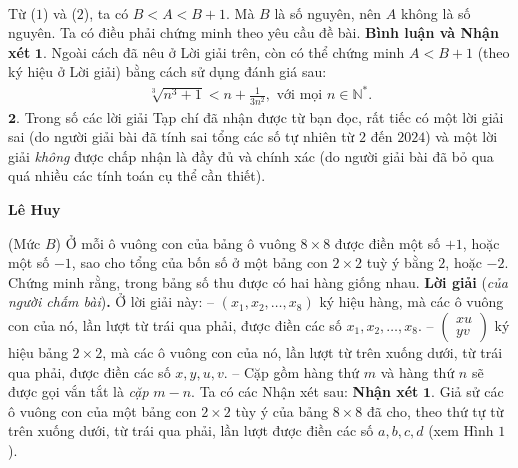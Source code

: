 \begin{multicols}{2}
\begin{align*}
	\end{align*}
	Từ ($1$) và ($2$), ta có $B < A < B + 1$. Mà $B$ là số nguyên, nên $A$ không là số nguyên.
	\vskip 0.05cm
	Ta có điều phải chứng minh theo yêu cầu đề bài.
	\vskip 0.05cm
	\textbf{Bình luận và Nhận xét}
	\vskip 0.05cm
	$\pmb{1.}$ Ngoài cách đã nêu ở Lời giải trên, còn có thể chứng minh $A < B + 1$ (theo ký hiệu ở Lời giải) bằng cách sử dụng đánh giá sau:
	\begin{align*}
		\sqrt[3]{{{n^3} + 1}} < n + \frac{1}{{3{n^2}}}, \text{ với mọi } n \in \mathbb{N^*}.
	\end{align*}
	$\pmb{2.}$ Trong số các lời giải Tạp chí đã nhận được từ bạn đọc, rất tiếc có một lời giải sai (do người giải bài đã tính sai tổng các số tự nhiên từ $2$ đến $2024$) và một lời giải \textit{không} được chấp nhận là đầy đủ và chính xác (do người giải bài đã bỏ qua quá nhiều các tính toán cụ thể cần thiết).
	\begin{flushright}
		\textbf{Lê Huy}
	\end{flushright}
	{}
	(Mức $B$) Ở mỗi ô vuông con của bảng ô vuông $8\times8$ được điền một số $+1$, hoặc một số $-1$, sao cho tổng của bốn số ở một bảng con $2\times2$ tuỳ ý bằng $2$, hoặc $-2$. Chứng minh rằng, trong bảng số thu được có hai hàng giống nhau.
	\vskip 0.05cm
	\textbf{Lời giải} (\textit{của người chấm bài})\textbf{.}
	\vskip 0.05cm
	Ở lời giải này:
	\vskip 0.05cm
	-- $\left( {{x_1},{x_2}, \ldots ,{x_8}} \right)$ ký hiệu hàng, mà các ô vuông con của nó, lần lượt từ trái qua phải, được điền các số  ${x_1},{x_2}, \ldots ,{x_8}.$
	\vskip 0.05cm
	-- $\left( \begin{array}{l}
		xu\\
		yv
	\end{array} \right)$  ký hiệu bảng $2 \times  2$, mà các ô vuông con của nó, lần lượt từ trên xuống dưới, từ trái qua phải, được điền các số $x, y, u, v$.
	\vskip 0.05cm
	-- Cặp gồm hàng thứ $m$ và hàng thứ $n$ sẽ được gọi vắn tắt là \textit{cặp} $m - n$.
	\vskip 0.05cm
	Ta có các Nhận xét sau:
	\vskip 0.05cm
	\textbf{Nhận xét} $\pmb{1.}$ Giả sử các ô vuông con của một bảng con $2 \times  2$ tùy ý của bảng $8 \times  8$ đã cho, theo thứ tự từ trên xuống dưới, từ trái qua phải, lần lượt được điền các số $a, b, c, d$ (xem Hình $1$).
	\begin{table}[H]
		\vspace*{-5pt}
		\centering
		\captionsetup{labelformat= empty, justification=centering}
			\begin{tabular}{|c|c|}

\end{tabular}
\end{table}
\end{multicols}
